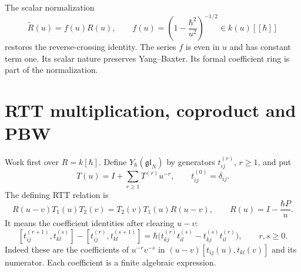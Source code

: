 The scalar normalization
\[
 \widetilde R(u)=f(u)R(u),\qquad
 f(u)=\left(1-\frac{\hbar^2}{u^2}\right)^{-1/2}
 \in k(u)[[\hbar]]
\]
restores the reverse-crossing identity.
The series $f$ is even in $u$ and has constant term one. Its scalar nature preserves Yang--Baxter.
Its formal coefficient ring is part of the normalization.

\section{RTT multiplication, coproduct and PBW}

Work first over $R=k[\hbar]$.
Define $Y_\hbar(\mathfrak{gl}_N)$ by generators $t_{ij}^{(r)}$, $r\ge1$, and put
\[
 T(u)=I+\sum_{r\ge1}T^{(r)}u^{-r},\qquad
 t_{ij}^{(0)}=\delta_{ij}.
\]
The defining RTT relation is
\[
 R(u-v)T_1(u)T_2(v)=T_2(v)T_1(u)R(u-v),
 \qquad R(u)=I-\frac{\hbar P}{u}.
\]
It means the coefficient identities after clearing $u-v$:
\begin{equation}
\label{eq:alg-rtt-coefficients}
 [t_{ij}^{(r+1)},t_{kl}^{(s)}]-[t_{ij}^{(r)},t_{kl}^{(s+1)}]
 =\hbar\bigl(t_{kj}^{(r)}t_{il}^{(s)}-t_{kj}^{(s)}t_{il}^{(r)}\bigr),
 \qquad r,s\ge0.
\end{equation}
Indeed these are the coefficients of $u^{-r}v^{-s}$ in
$(u-v)[t_{ij}(u),t_{kl}(v)]$ and its numerator.
Each coefficient is a finite algebraic expression.

